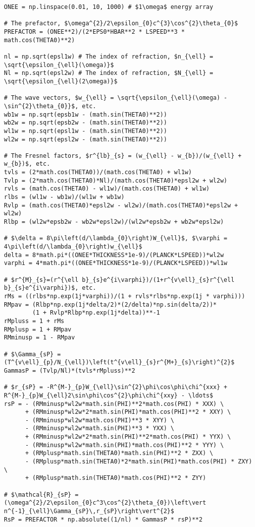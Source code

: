 \documentclass[letterpaper,10pt]{article}
\begin{document}
\begin{verbatim}
ONEE = np.linspace(0.01, 10, 1000) # $1\omega$ energy array

# The prefactor, $\omega^{2}/2\epsilon_{0}c^{3}\cos^{2}\theta_{0}$
PREFACTOR = (ONEE**2)/(2*EPS0*HBAR**2 * LSPEED**3 * math.cos(THETA0)**2)

nl = np.sqrt(epsl1w) # The index of refraction, $n_{\ell} = \sqrt{\epsilon_{\ell}(\omega)}$
Nl = np.sqrt(epsl2w) # The index of refraction, $N_{\ell} = \sqrt{\epsilon_{\ell}(2\omega)}$

# The wave vectors, $w_{\ell} = \sqrt{\epsilon_{\ell}(\omega) - \sin^{2}\theta_{0}}$, etc.
wb1w = np.sqrt(epsb1w - (math.sin(THETA0)**2))
wb2w = np.sqrt(epsb2w - (math.sin(THETA0)**2))
wl1w = np.sqrt(epsl1w - (math.sin(THETA0)**2))
wl2w = np.sqrt(epsl2w - (math.sin(THETA0)**2))

# The Fresnel factors, $r^{lb}_{s} = (w_{\ell} - w_{b})/(w_{\ell} + w_{b})$, etc.
tvls = (2*math.cos(THETA0))/(math.cos(THETA0) + wl1w)
Tvlp = (2*math.cos(THETA0)*Nl)/(math.cos(THETA0)*epsl2w + wl2w)
rvls = (math.cos(THETA0) - wl1w)/(math.cos(THETA0) + wl1w)
rlbs = (wl1w - wb1w)/(wl1w + wb1w)
Rvlp = (math.cos(THETA0)*epsl2w - wl2w)/(math.cos(THETA0)*epsl2w + wl2w)
Rlbp = (wl2w*epsb2w - wb2w*epsl2w)/(wl2w*epsb2w + wb2w*epsl2w)

# $\delta = 8\pi\left(d/\lambda_{0}\right)W_{\ell}$, $\varphi = 4\pi\left(d/\lambda_{0}\right)w_{\ell}$
delta = 8*math.pi*((ONEE*THICKNESS*1e-9)/(PLANCK*LSPEED))*wl2w
varphi = 4*math.pi*((ONEE*THICKNESS*1e-9)/(PLANCK*LSPEED))*wl1w

# $r^{M}_{s}=(r^{\ell b}_{s}e^{i\varphi})/(1+r^{v\ell}_{s}r^{\ell b}_{s}e^{i\varphi})$, etc.
rMs = ((rlbs*np.exp(1j*varphi))/(1 + rvls*rlbs*np.exp(1j * varphi)))
RMpav = (Rlbp*np.exp(1j*delta/2)*(2/delta)*np.sin(delta/2))*
        (1 + Rvlp*Rlbp*np.exp(1j*delta))**-1
rMpluss = 1 + rMs
RMplusp = 1 + RMpav
RMminusp = 1 - RMpav

# $\Gamma_{sP} = (T^{v\ell}_{p}/N_{\ell})\left(t^{v\ell}_{s}r^{M+}_{s}\right)^{2}$
GammasP = (Tvlp/Nl)*(tvls*rMpluss)**2

# $r_{sP} = -R^{M-}_{p}W_{\ell}\sin^{2}\phi\cos\phi\chi^{xxx} + R^{M-}_{p}W_{\ell}2\sin\phi\cos^{2}\phi\chi^{xxy} - \ldots$
rsP = - (RMminusp*wl2w*math.sin(PHI)**2*math.cos(PHI) * XXX) \
      + (RMminusp*wl2w*2*math.sin(PHI)*math.cos(PHI)**2 * XXY) \
      - (RMminusp*wl2w*math.cos(PHI)**3 * XYY) \
      - (RMminusp*wl2w*math.sin(PHI)**3 * YXX) \
      + (RMminusp*wl2w*2*math.sin(PHI)**2*math.cos(PHI) * YYX) \
      - (RMminusp*wl2w*math.sin(PHI)*math.cos(PHI)**2 * YYY) \
      + (RMplusp*math.sin(THETA0)*math.sin(PHI)**2 * ZXX) \
      - (RMplusp*math.sin(THETA0)*2*math.sin(PHI)*math.cos(PHI) * ZXY) \
      + (RMplusp*math.sin(THETA0)*math.cos(PHI)**2 * ZYY)

# $\mathcal{R}_{sP} = (\omega^{2}/2\epsilon_{0}c^3\cos^{2}\theta_{0})\left\vert n^{-1}_{\ell}\Gamma_{sP}\,r_{sP}\right\vert^{2}$
RsP = PREFACTOR * np.absolute((1/nl) * GammasP * rsP)**2
\end{verbatim}
\end{document}
